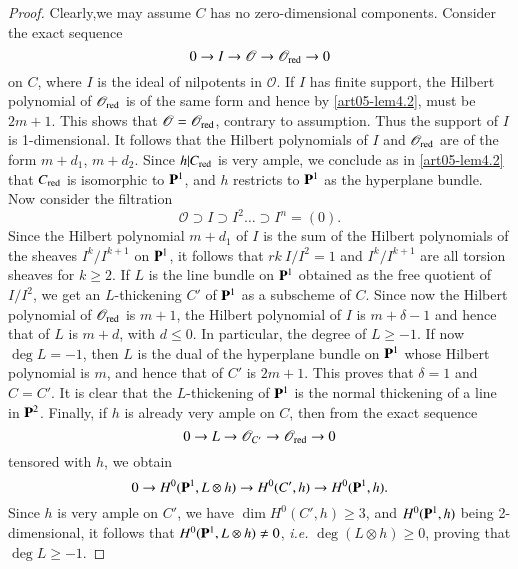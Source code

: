 \begin{proof}
Clearly,\pageoriginale we may assume $C$ has no zero-dimensional
components. Consider the exact sequence
$$
0\to I\to \mathscr{O}\to \mathscr{O}_{\operatorname{red}}\to 0
$$
on $C$, where $I$ is the ideal of nilpotents in $\mathscr{O}$. If $I$
has finite support, the Hilbert polynomial of $\mathscr{O}_{\operatorname{red}}$ is
of the same form and hence by \ref{art05-lem4.2}, must be $2m+1$. This
shows that $\mathscr{O}=\mathscr{O}_{\operatorname{red}}$, contrary to
assumption. Thus the support of $I$ is 1-dimensional. It follows that
the Hilbert polynomials of $I$ and $\mathscr{O}_{\operatorname{red}}$ are of the
form $m+d_{1}$, $m+d_{2}$. Since $h|C_{\operatorname{red}}$ is very ample, we
conclude as in \ref{art05-lem4.2} that $C_{\operatorname{red}}$ is isomorphic to
$\mathbf{P}^{1}$, and $h$ restricts to $\mathbf{P}^{1}$ as the hyperplane
bundle. Now consider the filtration
$$
\mathscr{O}\supset I\supset I^{2}\ldots\supset I^{n}=(0).
$$
Since the Hilbert polynomial $m+d_{1}$ of $I$ is the sum of the
Hilbert polynomials of the sheaves $I^{k}/I^{k+1}$ on $\mathbf{P}^{1}$, it
follows that $rk\ I/I^{2}=1$ and $I^{k}/I^{k+1}$ are all torsion
sheaves for $k\geq 2$. If $L$ is the line bundle on $\mathbf{P}^{1}$
obtained as the free quotient of $I/I^{2}$, we get an $L$-thickening
$C'$ of $\mathbf{P}^{1}$ as a subscheme of $C$. Since now the Hilbert
polynomial of $\mathscr{O}_{\operatorname{red}}$ is $m+1$, the Hilbert polynomial of
$I$ is $m+\delta-1$ and hence that of $L$ is $m+d$, with $d\leq 0$. In
particular, the degree of $L\geq -1$. If now $\deg L=-1$, then $L$ is
the dual of the hyperplane bundle on $\mathbf{P}^{1}$ whose Hilbert
polynomial is $m$, and hence that of $C'$ is $2m+1$. This proves that
$\delta=1$ and $C=C'$. It is clear that the $L$-thickening of
$\mathbf{P}^{1}$ is the normal thickening of a line in $\mathbf{P}^{2}$. Finally,
if $h$ is already very ample on $C$, then from the exact sequence
$$
0\to L\to \mathscr{O}_{C'}\to \mathscr{O}_{\operatorname{red}}\to 0
$$
tensored with $h$, we obtain
$$
0\to H^{0}(\mathbf{P}^{1},L\otimes h)\to H^{0}(C',h)\to H^{0}(\mathbf{P}^{1},h).
$$
Since $h$ is very ample on $C'$, we have $\dim H^{0}(C',h)\geq 3$, and
$H^{0}(\mathbf{P}^{1},h)$ being 2-dimensional, it follows that
$H^{0}(\mathbf{P}^{1},L\otimes h)\neq 0$, {\em i.e.} $\deg (L\otimes h)\geq
0$, proving that $\deg L\geq -1$.
\end{proof}

